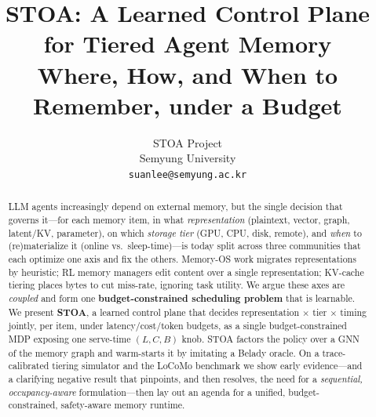 \documentclass[10pt,twocolumn]{article}
\title{\textbf{STOA: A Learned Control Plane for Tiered Agent Memory}\\
\large Where, How, and When to Remember, under a Budget}
\author{STOA Project\\ Semyung University\\ \texttt{suanlee@semyung.ac.kr}}
\date{}
\begin{document}
\maketitle

\begin{abstract}
LLM agents increasingly depend on external memory, but the single decision that governs it---for each
memory item, in what \emph{representation} (plaintext, vector, graph, latent/KV, parameter), on which
\emph{storage tier} (GPU, CPU, disk, remote), and \emph{when} to (re)materialize it (online vs.\
sleep-time)---is today split across three communities that each optimize one axis and fix the others.
Memory-OS work migrates representations by heuristic; RL memory managers edit content over a single
representation; KV-cache tiering places bytes to cut miss-rate, ignoring task utility. We argue these
axes are \emph{coupled} and form one \textbf{budget-constrained scheduling problem} that is learnable. We
present \textbf{STOA}, a learned control plane that decides representation $\times$ tier $\times$ timing
jointly, per item, under latency/cost/token budgets, as a single budget-constrained MDP exposing one
serve-time \textbf{$(L,C,B)$} knob. STOA factors the policy over a GNN of the memory graph and
warm-starts it by imitating a Belady oracle. On a trace-calibrated tiering simulator and the LoCoMo
benchmark we show early evidence---and a clarifying negative result that pinpoints, and then resolves, the
need for a \emph{sequential, occupancy-aware} formulation---then lay out an agenda for a unified,
budget-constrained, safety-aware memory runtime.
\end{abstract}












\end{document}
